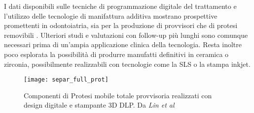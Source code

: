 I dati disponibili sulle tecniche di programmazione digitale del trattamento e l'utilizzo delle tecnologie di manifattura additiva mostrano prospettive promettenti in odontoiatria, sia per la produzione di provvisori \parencite{Reference125} che di protesi removibili \parencite{Reference107}. Ulteriori studi e valutazioni con follow-up più lunghi sono comunque necessari prima di un'ampia applicazione clinica della tecnologia.  Resta inoltre poco esplorata la possibilità di produrre manufatti definitivi in ceramica o zirconia, possibilmente realizzabili con tecnologie come la SLS  o la stampa inkjet.
\begin{figure}[h]
\vspace{-10pt}
	\begin{center}
	\texttt{[image: separ\_full\_prot]}
    \caption{Componenti di Protesi mobile totale provvisoria realizzati con design digitale e stampante 3D DLP. Da \emph{Lin et al} \parencite{Reference108}}
    \label{fig:separ_full_prot}
    \end{center}
\vspace{-30pt}
\end{figure}

